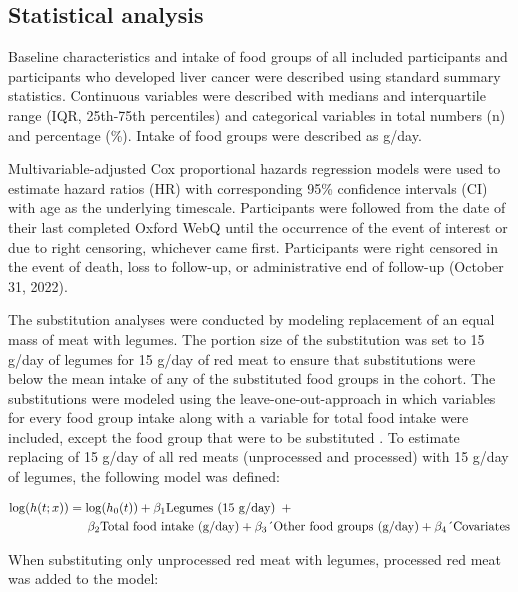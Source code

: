 \documentclass[nutrients,article,submit,moreauthors,pdftex]{Definitions/mdpi}
\begin{document}
\hypertarget{subsec6}{%
\subsection{Statistical analysis}\label{subsec6}}

Baseline characteristics and intake of food groups of all included
participants and participants who developed liver cancer were described
using standard summary statistics. Continuous variables were described
with medians and interquartile range (IQR, 25th-75th percentiles) and
categorical variables in total numbers (n) and percentage (\%). Intake of
food groups were described as g/day.

Multivariable-adjusted Cox proportional hazards regression models were
used to estimate hazard ratios (HR) with corresponding 95\% confidence
intervals (CI) with age as the underlying timescale. Participants were
followed from the date of their last completed Oxford WebQ until the
occurrence of the event of interest or due to right censoring, whichever
came first. Participants were right censored in the event of death, loss
to follow-up, or administrative end of follow-up (October 31, 2022).

The substitution analyses were conducted by modeling replacement of an
equal mass of meat with legumes. The portion size of the substitution
was set to 15 g/day of legumes for 15 g/day of red meat to ensure that
substitutions were below the mean intake of any of the substituted food
groups in the cohort. The substitutions were modeled using the
leave-one-out-approach in which variables for every food group intake
along with a variable for total food intake were included, except the
food group that were to be substituted \citep{Ibsen2021}. To estimate
replacing of 15 g/day of all red meats (unprocessed and processed) with
15 g/day of legumes, the following model was defined:

{\small
\begin{align}
\log(h(t;x)) &= \log(h_0(t)) + \beta_1 \text{Legumes (15 g/day)} \hspace{0.5em} + \nonumber \\
&\quad \hspace{0.5em} \beta_2 \text{Total food intake (g/day)} + \beta_3 \text{´Other food groups (g/day)} + \beta_4 \text{´Covariates}
\end{align}
}

\noindent When substituting only unprocessed red meat with legumes,
processed red meat was added to the model:
\end{document}
